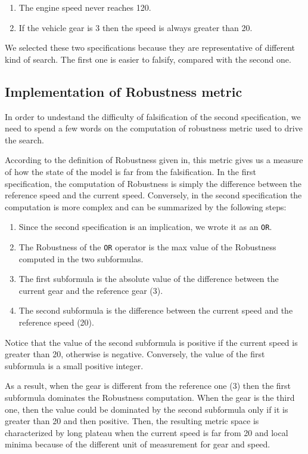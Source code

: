 \documentclass[11pt]{article}
\begin{document}
\begin{enumerate}
    \item The engine speed never reaches 120.
    \item If the vehicle gear is 3 then the speed is always greater than 20.
\end{enumerate}

We selected these two specifications because they are representative of different kind of search. The first one is easier to falsify, compared with the second one.

\subsection{Implementation of Robustness metric}
In order to undestand the difficulty of falsification of the second specification, we need to spend a few words on the computation of robustness metric used to drive the search.

According to the definition of Robustness given in\cite{fainekos2006robustness}, this metric gives us a measure of how the state of the model is far from the falsification. In the first specification,    the computation of Robustness is simply the difference between the reference speed and the current speed. Conversely, in the second specification the computation is more complex and can be summarized by  the following steps:

\begin{enumerate}
\item Since the second specification is an implication, we wrote it as an \texttt{OR}.
\item The Robustness of the \texttt{OR} operator is the max value of the Robustness computed in the two subformulas.
\item The first subformula is the absolute value of the difference between the current gear and the reference gear (3).
\item The second subformula is the difference between the current speed and the reference speed (20).
\end{enumerate}

Notice that the value of the second subformula is positive if the current speed is greater than 20, otherwise is negative. Conversely, the value of the first subformula is a small positive integer.

As a result, when the gear is different from the reference one (3) then the first subformula dominates the Robustness computation. When the gear is the third one, then the value could be dominated by     the second subformula only if it is greater than 20 and then positive. Then, the resulting metric space is characterized by long plateau when the current speed is far from 20 and local minima because of  the different unit of measurement for gear and speed.
\end{document}
